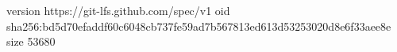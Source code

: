 version https://git-lfs.github.com/spec/v1
oid sha256:bd5d70efaddf60c6048cb737fe59ad7b567813ed613d53253020d8e6f33aee8e
size 53680

